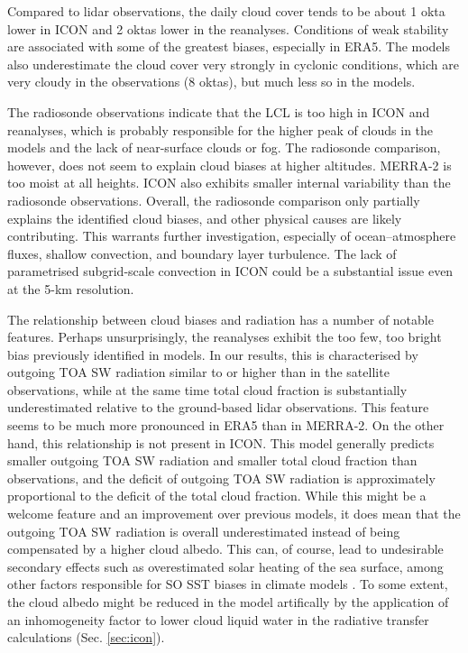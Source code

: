 \documentclass[12pt,a4paper]{article}
\begin{document}
Compared to lidar observations, the daily cloud cover tends to be about 1 okta
lower in ICON and 2 oktas lower in the reanalyses.  Conditions of weak
stability are associated with some of the greatest biases, especially in ERA5.
The models also underestimate the cloud cover very strongly in cyclonic
conditions, which are very cloudy in the observations (8 oktas), but much less
so in the models.

The radiosonde observations indicate that the LCL is too high in ICON and
reanalyses, which is probably responsible for the higher peak of clouds in the
models and the lack of near-surface clouds or fog. The radiosonde comparison,
however, does not seem to explain cloud biases at higher altitudes.  MERRA-2 is
too moist at all heights.  ICON also exhibits smaller internal variability than
the radiosonde observations. Overall, the radiosonde comparison only partially
explains the identified cloud biases, and other physical causes are likely
contributing.  This warrants further investigation, especially of
ocean--atmosphere fluxes, shallow convection, and boundary layer turbulence.
The lack of parametrised subgrid-scale convection in ICON could be a
substantial issue even at the 5-km resolution.

The relationship between cloud biases and radiation has a number of notable
features. Perhaps unsurprisingly, the reanalyses exhibit the too few, too
bright bias previously identified in models. In our results, this is
characterised by outgoing TOA SW radiation similar to or higher than in the
satellite observations, while at the same time total cloud fraction is
substantially underestimated relative to the ground-based lidar observations.
This feature seems to be much more pronounced in ERA5 than in MERRA-2. On the
other hand, this relationship is not present in ICON. This model generally
predicts smaller outgoing TOA SW radiation and smaller total cloud fraction
than observations, and the deficit of outgoing TOA SW radiation is
approximately proportional to the deficit of the total cloud fraction. While
this might be a welcome feature and an improvement over previous models, it
does mean that the outgoing TOA SW radiation is overall underestimated instead
of being compensated by a higher cloud albedo.  This can, of course, lead to
undesirable secondary effects such as overestimated solar heating of the sea
surface, among other factors responsible for SO SST biases in climate models
\citep{zhang2023,luo2023,hyder2018}.  To some extent, the cloud albedo might be
reduced in the model artifically by the application of an inhomogeneity factor
to lower cloud liquid water in the radiative transfer calculations (Sec.
\ref{sec:icon}).
\end{document}

